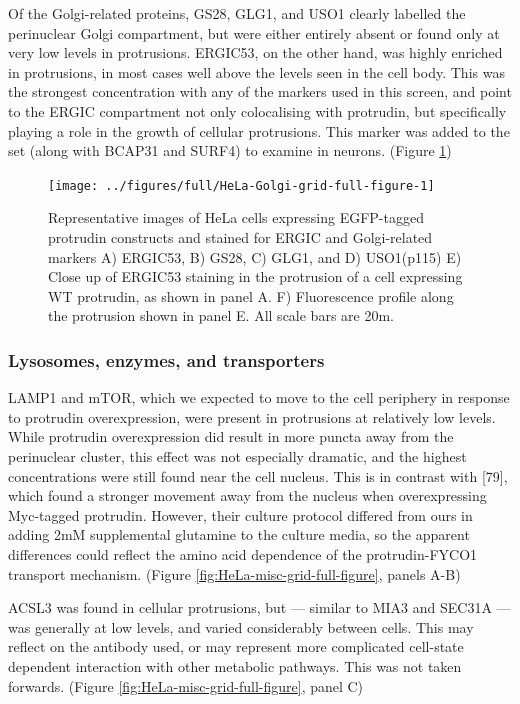\documentclass[
  12pt,
  a4paper,
]{book}
\begin{document}
Of the Golgi-related proteins, GS28, GLG1, and USO1 clearly labelled the perinuclear Golgi compartment, but were either entirely absent or found only at very low levels in protrusions. ERGIC53, on the other hand, was highly enriched in protrusions, in most cases well above the levels seen in the cell body. This was the strongest concentration with any of the markers used in this screen, and point to the ERGIC compartment not only colocalising with protrudin, but specifically playing a role in the growth of cellular protrusions. This marker was added to the set (along with BCAP31 and SURF4) to examine in neurons. (Figure \ref{fig:HeLa-Golgi-grid-full-figure})

\begin{figure}
\texttt{[image: ../figures/full/HeLa-Golgi-grid-full-figure-1]} \caption[Protrudin-expressing HeLa cells stained for ERGIC53, GS28, GLG1, and USO1]{Representative images of HeLa cells expressing EGFP-tagged protrudin constructs and stained for ERGIC and Golgi-related markers A) ERGIC53, B) GS28, C) GLG1, and D) USO1(p115)  E) Close up of ERGIC53 staining in the protrusion of a cell expressing WT protrudin, as shown in panel A.  F) Fluorescence profile along the protrusion shown in panel E.  All scale bars are 20\textmu{}m.}\label{fig:HeLa-Golgi-grid-full-figure}
\end{figure}

\hypertarget{lysosomes-enzymes-and-transporters}{%
\subsubsection{Lysosomes, enzymes, and transporters}\label{lysosomes-enzymes-and-transporters}}

LAMP1 and mTOR, which we expected to move to the cell periphery in response to protrudin overexpression, were present in protrusions at relatively low levels. While protrudin overexpression did result in more puncta away from the perinuclear cluster, this effect was not especially dramatic, and the highest concentrations were still found near the cell nucleus. This is in contrast with {[}79{]}, which found a stronger movement away from the nucleus when overexpressing Myc-tagged protrudin. However, their culture protocol differed from ours in adding 2mM supplemental glutamine to the culture media, so the apparent differences could reflect the amino acid dependence of the protrudin-FYCO1 transport mechanism. (Figure \ref{fig:HeLa-misc-grid-full-figure}, panels A-B)

ACSL3 was found in cellular protrusions, but --- similar to MIA3 and SEC31A --- was generally at low levels, and varied considerably between cells. This may reflect on the antibody used, or may represent more complicated cell-state dependent interaction with other metabolic pathways. This was not taken forwards. (Figure \ref{fig:HeLa-misc-grid-full-figure}, panel C)
\end{document}
